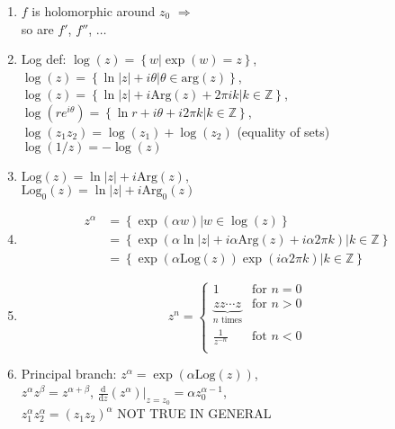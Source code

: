 \documentclass[11pt,a4paper]{article}
\begin{document}
\begin{multicols}{2}
\begin{enumerate}[resume]
\item $f$ is holomorphic around $z_0$ $\Rightarrow$ \\so are $f'$, $f''$, $\ldots$

\item Log def: $\log (z) = \left\{ w | \exp (w) = z \right\}$, \\$\log (z) = \left\{ \ln |z| + i \theta | \theta \in \mathrm{arg}(z) \right\}$, \\$\log (z) = \left\{ \ln |z| + i \mathrm{Arg}(z) + 2 \pi i k | k \in \mathbb{Z} \right\}$, \\$\log \left( re^{i\theta} \right) = \left\{ \ln r + i \theta + i 2 \pi k | k \in \mathbb{Z} \right\}$, \\$\log (z_1 z_2) = \log (z_1) + \log (z_2)$ (equality of sets) \\$\log (1/z)  = -\log (z)$

\item $\mathrm{Log}(z) = \ln |z| + i \mathrm{Arg}(z)$, \\$\mathrm{Log}_0(z) = \ln |z| + i \mathrm{Arg}_0(z)$

\item 
\begin{align*}
z^{\alpha} &= \left\{ \exp (\alpha w) | w \in \log (z) \right\} \\
&= \left\{ \exp \left( \alpha \ln |z| + i \alpha \mathrm{Arg}(z) + i \alpha 2 \pi k \right) | k \in \mathbb{Z} \right\} \\
&= \left\{ \exp \left( \alpha \mathrm{Log}(z) \right) \exp (i \alpha 2 \pi k) | k \in \mathbb{Z} \right\}
\end{align*}

\item \[
z^n = 
\begin{cases}
1 & \text{for } n=0 \\
\underbrace{z z \cdots z}_{n \text{ times}} & \text{for } n > 0 \\
\frac{1}{z^{-n}} & \text{fot } n < 0 \\
\end{cases}
\]

\item Principal branch: $z^{\alpha} = \exp \left( \alpha \mathrm{Log}(z) \right)$, \\$z^{\alpha} z^{\beta} = z^{\alpha + \beta}$, $\frac{\mathrm{d}}{\mathrm{d}z} \left( z^{\alpha} \right) |_{z=z_0} = \alpha z_0^{\alpha -1}$, \\$z_1^{\alpha} z_2^{\alpha} = (z_1 z_2)^{\alpha}$ NOT TRUE IN GENERAL
\end{enumerate}


\end{multicols}
\end{document}
